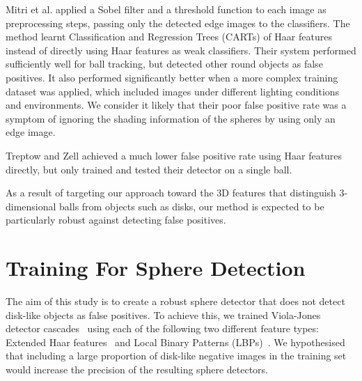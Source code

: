 \documentclass{sig-alternate-05-2015}
\newcommand{\tmpcomment}[1]{}
\newcommand{\citep}[1]{\cite{#1}}
\newcommand{\citet}[1]{\cite{#1}}
\begin{document}
{		Mitri et al. \citet{mitri2004fast} applied a Sobel filter and a threshold function to each image as preprocessing steps, passing only the detected edge images to the classifiers. The method learnt Classification and Regression Trees (CARTs) of Haar features instead of directly using Haar features as weak classifiers. Their system performed sufficiently well for ball tracking, but detected other round objects as false positives. It also performed significantly better when a more complex training dataset was applied, which included images under different lighting conditions and environments. We consider it likely that their poor false positive rate was a symptom of ignoring the shading information of the spheres by using only an edge image.

		Treptow and Zell \citet{treptow2004filter} achieved a much lower false positive rate using Haar features directly, but only trained and tested their detector on a single ball.

		As a result of targeting our approach toward the 3D features that distinguish 3-dimensional balls from objects such as disks, our method is expected to be particularly robust against detecting false positives.

	}

	\section{Training For Sphere Detection} {

		The aim of this study is to create a robust sphere detector that does not detect disk-like objects as false positives. To achieve this, we trained Viola-Jones detector cascades~\citep{viola2001rapid} using each of the following two different feature types: Extended Haar features~\citep{Lienhart2002extended}\tmpcomment{, Histograms of Oriented Gradients (HoG) features~\citep{dalal2005histograms},} and Local Binary Patterns (LBPs)~\citep{liao2007learning}. We hypothesised that including a large proportion of disk-like negative images in the training set would increase the precision of the resulting sphere detectors.



	}
\end{document}
